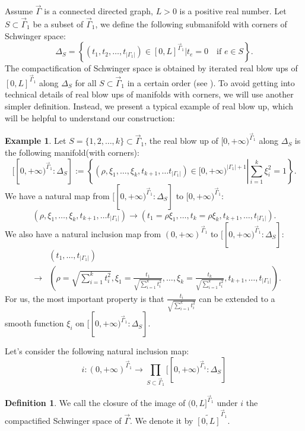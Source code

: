 \documentclass[11pt]{amsart}
\theoremstyle{definition}
\newtheorem{exa}[thm]{Example}
\newtheorem{defn}[thm]{Definition}
\theoremstyle{remark}
\numberwithin{equation}{section}
\begin{document}
Assume $\vec{\Gamma}$ is a connected directed graph, $L > 0$ is a positive real
number. Let $S \subset \vec{\Gamma}_1$ be a subset of $\vec{\Gamma}_1$, we define the
following submanifold with corners of Schwinger space:
\[ \Delta_S = \left\{ (t_1, t_2, \ldots, t_{| \Gamma_1 |}) \in [0, L]^{\vec{\Gamma}_1} |  t_e = 0 \quad \text{if } e \in S \right\} . \]
The compactification of Schwinger space is obtained by iterated real blow ups
of $[0, L]^{\vec{\Gamma}_1}$ along $\Delta_S$ for all $S \subset \vec{\Gamma}_1$ in
a certain order (see {\cite{epub47792,Ammann2019ACO}}). To avoid getting into
technical details of real blow ups of manifolds with corners, we will use
another simpler definition. Instead, we present a typical example of real blow
up, which will be helpful to understand our construction:
\begin{exa}
  Let $S = \{ 1, 2, \ldots, k \} \subset \vec{\Gamma}_1$, the real blow up of $[0,
  + \infty)^{\vec{\Gamma}_1}$ along $\Delta_S$ is the following manifold(with
  corners):
  \[ [[0, + \infty)^{\vec{\Gamma}_1 } : \Delta_S] := \left\{ (\rho, \xi_1,
     \ldots, \xi_k, t_{k + 1}, \ldots t_{| \Gamma_1 |}) \in [0, + \infty)^{|
     \Gamma_1 | + 1} \left| \sum_{i = 1}^k \xi_i^2 = 1 \right. \right\} . \]
  We have a natural map from $[[0, + \infty)^{\vec{\Gamma}_1 } : \Delta_S]$ to
  $[0, + \infty)^{\vec{\Gamma}_1 }$:
  \[ (\rho, \xi_1, \ldots, \xi_k, t_{k + 1}, \ldots t_{| \Gamma_1 |})
     \rightarrow (t_1 = \rho \xi_1, \ldots, t_k = \rho \xi_k, t_{k + 1},
     \ldots, t_{| \Gamma_1 |}) . \]
  We also have a natural inclusion map from $(0, + \infty)^{\vec{\Gamma}_1 }$ to
  $[[0, + \infty)^{\vec{\Gamma}_1 } : \Delta_S]$:
  \begin{eqnarray*}
    &  & (t_1, \ldots, t_{| \Gamma_1 |})\\
    & \rightarrow & \left( \rho = \sqrt{\sum_{i = 1}^k t_i^2}, \xi_1 =
    \frac{t_1}{\sqrt{\sum_{i = 1}^k t_i^2}}, \ldots, \xi_k =
    \frac{t_k}{\sqrt{\sum_{i = 1}^k t_i^2}}, t_{k + 1}, \ldots, t_{| \Gamma_1
    |} \right) .
  \end{eqnarray*}
  For us, the most important property is that $\frac{t_i}{\sqrt{\sum_{i = 1}^k
  t_i^2}}$ can be extended to a smooth function $\xi_i$ on $[[0, + \infty)^{\vec{\Gamma}_1 } : \Delta_S]$.
\end{exa}

Let's consider the following natural inclusion map:
\[ i : (0, + \infty)^{\vec{\Gamma}_1 } \rightarrow \prod_{S \subset \vec{\Gamma}_1}
   [[0, + \infty)^{\vec{\Gamma}_1 } : \Delta_S] \]
\begin{defn}
  We call the closure of the image of $(0, L]^{\vec{\Gamma}_1 }$ under $i$ the
  {{compactified Schwinger space}} of $\vec{\Gamma}$. We denote it by
  $\widetilde{[0, L]}^{\vec{\Gamma}_1 }$.
\end{defn}
\end{document}
